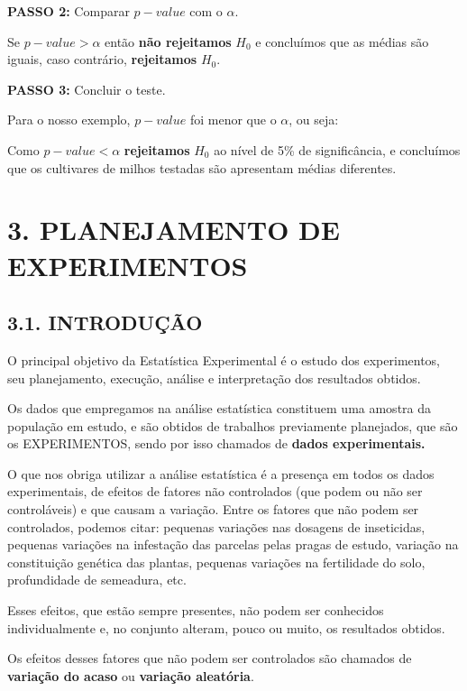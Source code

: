 \documentclass[
]{book}
\begin{document}
\textbf{PASSO 2:} Comparar \(p-value\) com o \(\alpha\).

Se \(p-value > \alpha\) então \textbf{não rejeitamos} \(H_0\) e concluímos que as médias são iguais, caso contrário, \textbf{rejeitamos} \(H_0\).

\textbf{PASSO 3:} Concluir o teste.

Para o nosso exemplo, \(p-value\) foi menor que o \(\alpha\), ou seja:

Como \(p-value < \alpha\) \textbf{rejeitamos } \(H_0\) ao nível de 5\% de significância, e concluímos que os cultivares de milhos testadas são apresentam médias diferentes.

\hypertarget{planejamento-de-experimentos}{%
\chapter{3. PLANEJAMENTO DE EXPERIMENTOS}\label{planejamento-de-experimentos}}

\hypertarget{introduuxe7uxe3o}{%
\section{3.1. INTRODUÇÃO}\label{introduuxe7uxe3o}}

O principal objetivo da Estatística Experimental é o estudo dos experimentos, seu planejamento, execução, análise e interpretação dos resultados obtidos.

Os dados que empregamos na análise estatística constituem uma amostra da população em estudo, e são obtidos de trabalhos previamente planejados, que são os EXPERIMENTOS, sendo por isso chamados de \textbf{dados experimentais.}

O que nos obriga utilizar a análise estatística é a presença em todos os dados experimentais, de efeitos de fatores não controlados (que podem ou não ser controláveis) e que causam a variação. Entre os fatores que não podem ser controlados, podemos citar: pequenas variações nas dosagens de inseticidas, pequenas variações na infestação das parcelas pelas pragas de estudo, variação na constituição genética das plantas, pequenas variações na fertilidade do solo, profundidade de semeadura, etc.

Esses efeitos, que estão sempre presentes, não podem ser conhecidos individualmente e, no conjunto alteram, pouco ou muito, os resultados obtidos.

Os efeitos desses fatores que não podem ser controlados são chamados de \textbf{variação do acaso} ou \textbf{variação aleatória}.
\end{document}
